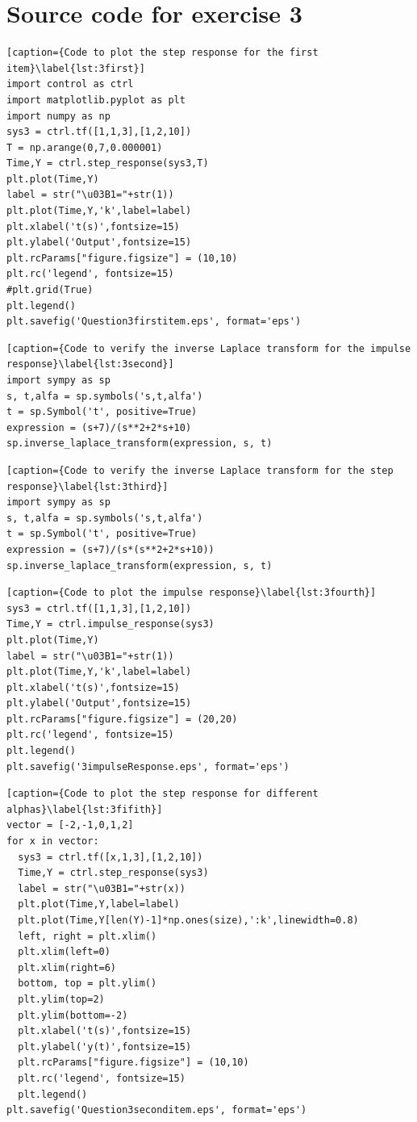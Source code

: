 \documentclass[a4paper,11pt]{article}
\begin{document}
\section{Source code for exercise 3}
\begin{lstlisting}[caption={Code to plot the step response for the first item}\label{lst:3first}]
import control as ctrl
import matplotlib.pyplot as plt
import numpy as np
sys3 = ctrl.tf([1,1,3],[1,2,10])
T = np.arange(0,7,0.000001)
Time,Y = ctrl.step_response(sys3,T)
plt.plot(Time,Y)
label = str("\u03B1="+str(1))
plt.plot(Time,Y,'k',label=label)
plt.xlabel('t(s)',fontsize=15)
plt.ylabel('Output',fontsize=15)
plt.rcParams["figure.figsize"] = (10,10)
plt.rc('legend', fontsize=15)
#plt.grid(True)
plt.legend()
plt.savefig('Question3firstitem.eps', format='eps')
\end{lstlisting}
\begin{lstlisting}[caption={Code to verify the inverse Laplace transform for the impulse response}\label{lst:3second}]
import sympy as sp
s, t,alfa = sp.symbols('s,t,alfa')
t = sp.Symbol('t', positive=True)
expression = (s+7)/(s**2+2*s+10)
sp.inverse_laplace_transform(expression, s, t)
\end{lstlisting}
\begin{lstlisting}[caption={Code to verify the inverse Laplace transform for the step response}\label{lst:3third}]
import sympy as sp
s, t,alfa = sp.symbols('s,t,alfa')
t = sp.Symbol('t', positive=True)
expression = (s+7)/(s*(s**2+2*s+10))
sp.inverse_laplace_transform(expression, s, t)
\end{lstlisting}
\begin{lstlisting}[caption={Code to plot the impulse response}\label{lst:3fourth}]
sys3 = ctrl.tf([1,1,3],[1,2,10])
Time,Y = ctrl.impulse_response(sys3)
plt.plot(Time,Y)
label = str("\u03B1="+str(1))
plt.plot(Time,Y,'k',label=label)
plt.xlabel('t(s)',fontsize=15)
plt.ylabel('Output',fontsize=15)
plt.rcParams["figure.figsize"] = (20,20)
plt.rc('legend', fontsize=15)
plt.legend()
plt.savefig('3impulseResponse.eps', format='eps')
\end{lstlisting}
\begin{lstlisting}[caption={Code to plot the step response for different alphas}\label{lst:3fifith}]
vector = [-2,-1,0,1,2]
for x in vector:
  sys3 = ctrl.tf([x,1,3],[1,2,10])
  Time,Y = ctrl.step_response(sys3)
  label = str("\u03B1="+str(x))
  plt.plot(Time,Y,label=label)
  plt.plot(Time,Y[len(Y)-1]*np.ones(size),':k',linewidth=0.8)
  left, right = plt.xlim()
  plt.xlim(left=0)
  plt.xlim(right=6)
  bottom, top = plt.ylim()
  plt.ylim(top=2)
  plt.ylim(bottom=-2)
  plt.xlabel('t(s)',fontsize=15)
  plt.ylabel('y(t)',fontsize=15)
  plt.rcParams["figure.figsize"] = (10,10)
  plt.rc('legend', fontsize=15)
  plt.legend()
plt.savefig('Question3seconditem.eps', format='eps')
\end{lstlisting}
\end{document}
